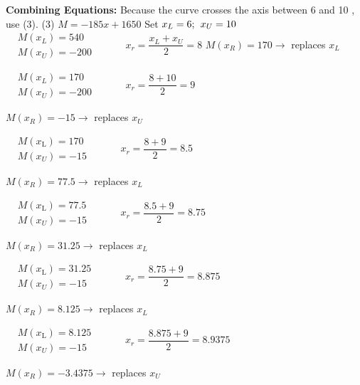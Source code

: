 \documentclass[../main.tex]{subfiles}
\begin{document}
\textbf{Combining Equations:}
\bigbreak
Because the curve crosses the axis between 6 and 10 , use (3).
\bigbreak
(3) $M=-185 x+1650$
\bigbreak
Set $x_{L}=6 ;\hspace*{0.15cm}	 x_{U}=10$ 
\bigbreak
$\begin{aligned}&M\left(x_{L}\right)=540 \\&M\left(x_{U}\right)=-200\end{aligned} \quad \quad\quad x_{r}=\dfrac{x_{L}+x_{U}}{2}=8$\smallbreak
$M\left(x_{R}\right)=170 \rightarrow$ replaces $x_{L}$
\bigbreak

$\begin{aligned}&M\left(x_{L}\right)=170 \\&M\left(x_{U}\right)=-200\end{aligned} \quad \quad\quad x_{r}=\dfrac{8+10}{2}=9$

$M\left(x_{R}\right)=-15 \rightarrow$ replaces $x_{U}$
\bigbreak

$\begin{aligned}&M\left(x_{\mathrm{L}}\right)=170 \\&M\left(x_{U}\right)=-15\end{aligned} \quad\quad\quad x_{r}=\dfrac{8+9}{2}=8.5$

$M\left(x_{R}\right)=77.5 \rightarrow$ replaces $x_{L}$
\bigbreak

$\begin{aligned}&M\left(x_{\mathrm{L}}\right)=77.5 \\&M\left(x_{U}\right)=-15\end{aligned} \quad\quad\quad x_{r}=\dfrac{8.5+9}{2}=8.75$

$M\left(x_{R}\right)=31.25 \rightarrow$ replaces $x_{L}$
\bigbreak

$\begin{aligned}&M\left(x_{\mathrm{L}}\right)=31.25 \\&M\left(x_{U}\right)=-15\end{aligned} \quad\quad\quad x_{r}=\dfrac{8.75+9}{2}=8.875$

$M\left(x_{R}\right)=8.125 \rightarrow$ replaces $x_{L}$
\bigbreak

$\begin{aligned}&M\left(x_{\mathrm{L}}\right)=8.125 \\&M\left(x_{U}\right)=-15\end{aligned} \quad\quad\quad x_{r}=\dfrac{8.875+9}{2}=8.9375$

$M\left(x_{R}\right)=-3.4375 \rightarrow$ replaces $x_{U}$
\bigbreak
\end{document}
